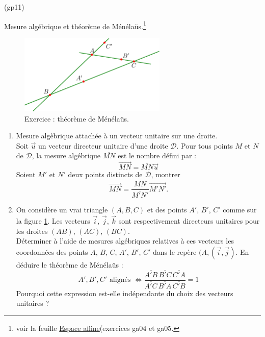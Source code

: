 \begin{tiny}(gp11)\end{tiny} Mesure algébrique et théorème de Ménéla{\"u}s.\footnote{voir la feuille \href{http://back.maquisdoc.net/data/temptex/fexga.pdf}{Espace affine}(exercices ga04 et ga05.}
\begin{figure}[h!]
  \centering
  \includegraphics[width=7cm]{Egp11_1.pdf}
  \caption{Exercice : théorème de Ménéla{\"u}s.}
  \label{fig:Egp11_1}
\end{figure}

\begin{enumerate}
 \item Mesure algèbrique attachée à un vecteur unitaire sur une droite.\\
Soit $\overrightarrow u$ un vecteur directeur unitaire d'une droite $\mathcal D$. Pour tous points $M$ et $N$ de $\mathcal D$, la mesure algébrique $\overline{MN}$ est le nombre défini par :
\begin{displaymath}
 \overrightarrow{MN} = \overline{MN}\overrightarrow{u}
\end{displaymath}
Soient $M'$ et $N'$ deux points distincts de $\mathcal D$, montrer  
\begin{displaymath}
 \overrightarrow{MN} = \dfrac{\overline{MN}}{\overline{M'N'}}\overrightarrow{M'N'}.
\end{displaymath}
\item On considère un vrai triangle $(A,B,C)$ et des points $A'$, $B'$, $C'$ comme sur la figure \ref{fig:Egp11_1}. Les vecteurs $\overrightarrow i$, $\overrightarrow j$, $\overrightarrow k$ sont respectivement directeurs unitaires pour les droites $(AB)$, $(AC)$, $(BC)$.\\ Déterminer à l'aide de mesures algébriques relatives à ces vecteurs les coordonnées des points $A$, $B$, $C$, $A'$, $B'$, $C'$ dans le repère $(A,(\overrightarrow i , \overrightarrow j)$. En déduire le théorème de Ménéla{\"u}s :
\begin{displaymath}
 A' , B', C' \text{ alignés } \Leftrightarrow
\dfrac{\overline{A'B}\,\overline{B'C}\,\overline{C'A}}{\overline{A'C}\,\overline{B'A}\,\overline{C'B}}=1
\end{displaymath}
Pourquoi cette expression est-elle indépendante du choix des vecteurs unitaires ?
\end{enumerate}
